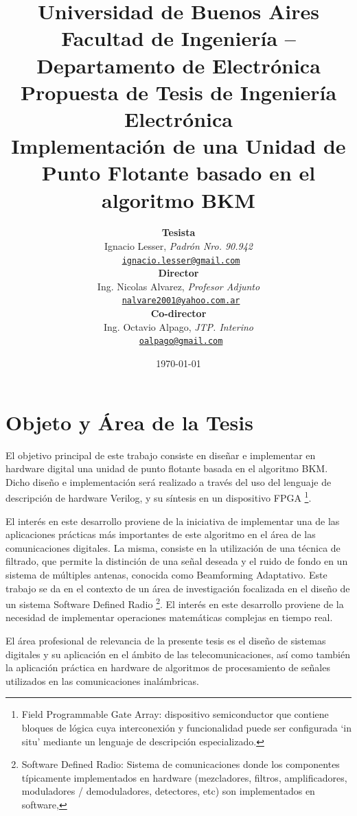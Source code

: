 \documentclass[a4paper]{article}
\title{
   {\normalsize
      Universidad de Buenos Aires\\
      Facultad de Ingeniería -- Departamento de Electrónica\\
      Propuesta de Tesis de Ingeniería Electrónica\\
      \vspace{0.7cm}
   }
   Implementación de una Unidad de Punto Flotante basado en el algoritmo BKM
}
\author{ \textbf{Tesista}                                                           \\
         Ignacio Lesser, \textit{Padrón Nro. 90.942}                                \\
         \texttt{ \href{mailto:ignacio.lesser@gmail.com}{ignacio.lesser@gmail.com}}  \\[2.5ex]
         \textbf{Director}                                                          \\
         Ing. Nicolas Alvarez, \textit{Profesor Adjunto}                            \\
         \texttt{ \href{mailto:nalvare2001@yahoo.com.ar}{nalvare2001@yahoo.com.ar}} \\[2.5ex]
         \textbf{Co-director}                                                       \\
         Ing. Octavio Alpago, \textit{JTP. Interino}                                \\
         \texttt{ \href{mailto:oalpago@gmail.com}{oalpago@gmail.com}}               \\[2.5ex]
       }
\date{\today}
\begin{document}
\maketitle



\thispagestyle{fancy}

\section{Objeto y Área de la Tesis}

El objetivo principal de este trabajo consiste en diseñar e implementar en hardware digital una unidad de punto flotante basada en el algoritmo BKM. Dicho diseño e implementación será realizado a través del uso del lenguaje de descripción de hardware Verilog, y su síntesis en un dispositivo FPGA \footnote{\label{FPGA}Field Programmable Gate Array: dispositivo semiconductor que contiene bloques de lógica cuya interconexión y funcionalidad puede ser configurada `in situ' mediante un lenguaje de descripción especializado.}.

El interés en este desarrollo proviene de la iniciativa de implementar una de las aplicaciones prácticas más importantes de este algoritmo en el área de las comunicaciones digitales. La misma, consiste en la utilización de una técnica de filtrado, que permite la distinción de una señal deseada y el ruido de fondo en un sistema de múltiples antenas, conocida como Beamforming Adaptativo. Este trabajo se da en el contexto de un área de investigación focalizada en el diseño de un sistema Software Defined Radio \footnote{\label{SDR}Software Defined Radio: Sistema de comunicaciones donde los componentes típicamente implementados en hardware (mezcladores, filtros, amplificadores, moduladores / demoduladores, detectores, etc) son implementados en software,}.
El interés en este desarrollo proviene de la necesidad de implementar operaciones matem\'aticas complejas en tiempo real.

El área profesional de relevancia de la presente tesis es el diseño de sistemas digitales y su aplicación en el ámbito de las telecomunicaciones, así como también la aplicación práctica en hardware de algoritmos de procesamiento de señales utilizados en las comunicaciones inalámbricas.

\newpage
\end{document}
